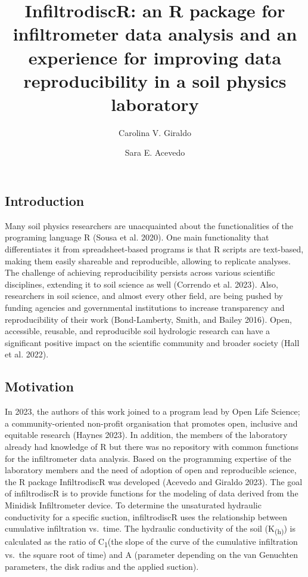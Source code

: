 \documentclass[
]{article}
\title{InfiltrodiscR: an R package for infiltrometer data analysis and
an experience for improving data reproducibility in a soil physics
laboratory}
\author[1]{Carolina V. Giraldo}
\author[1,2]{Sara E. Acevedo}
\affil[1]{Pontificia Universidad Católica de Chile}
\affil[2]{Centro de Desarrollo Urbano Sustentable (CEDEUS)}
\date{}
\begin{document}
\maketitle
\ifdefined\Shaded\renewenvironment{Shaded}{\begin{tcolorbox}[breakable, borderline west={3pt}{0pt}{shadecolor}, frame hidden, boxrule=0pt, sharp corners, enhanced, interior hidden]}{\end{tcolorbox}}\fi

\hypertarget{introduction}{%
\subsection{Introduction}\label{introduction}}

Many soil physics researchers are unacquainted about the functionalities
of the programing language R (Sousa et al. 2020). One main functionality
that differentiates it from spreadsheet-based programs is that R scripts
are text-based, making them easily shareable and reproducible, allowing
to replicate analyses. The challenge of achieving reproducibility
persists across various scientific disciplines, extending it to soil
science as well (Correndo et al. 2023). Also, researchers in soil
science, and almost every other field, are being pushed by funding
agencies and governmental institutions to increase transparency and
reproducibility of their work (Bond-Lamberty, Smith, and Bailey 2016).
Open, accessible, reusable, and reproducible soil hydrologic research
can have a significant positive impact on the scientific community and
broader society (Hall et al. 2022).

\hypertarget{motivation}{%
\subsection{Motivation}\label{motivation}}

In 2023, the authors of this work joined to a program lead by Open Life
Science; a community-oriented non-profit organisation that promotes
open, inclusive and equitable research (Haynes 2023). In addition, the
members of the laboratory already had knowledge of R but there was no
repository with common functions for the infiltrometer data analysis.
Based on the programming expertise of the laboratory members and the
need of adoption of open and reproducible science, the R package
InfiltrodiscR was developed (Acevedo and Giraldo 2023). The goal of
infiltrodiscR is to provide functions for the modeling of data derived
from the Minidisk Infiltrometer device. To determine the unsaturated
hydraulic conductivity for a specific suction, infiltrodiscR uses the
relationship between cumulative infiltration vs.~time. The hydraulic
conductivity of the soil (K\textsubscript{(h)}) is calculated as the
ratio of C\textsubscript{1}(the slope of the curve of the cumulative
infiltration vs.~the square root of time) and A (parameter depending on
the van Genuchten parameters, the disk radius and the applied suction).
\end{document}
